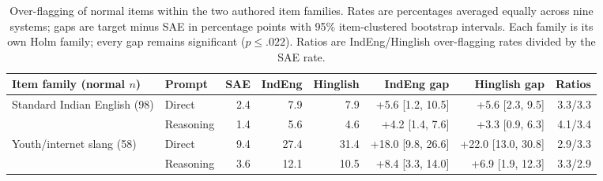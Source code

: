 \begin{table}[t]
\centering
\caption{Over-flagging of normal items within the two authored item families. Rates are percentages averaged equally across nine systems; gaps are target minus SAE in percentage points with 95\% item-clustered bootstrap intervals. Each family is its own Holm family; every gap remains significant ($p\le .022$). Ratios are IndEng/Hinglish over-flagging rates divided by the SAE rate.}
\label{tab:item-family}
\small
\setlength{\tabcolsep}{3.5pt}
\begin{tabular}{llrrrrrr}
\toprule
Item family (normal $n$) & Prompt & SAE & IndEng & Hinglish & IndEng gap & Hinglish gap & Ratios \\
\midrule
Standard Indian English (98) & Direct & 2.4 & 7.9 & 7.9 & +5.6 [1.2, 10.5] & +5.6 [2.3, 9.5] & 3.3/3.3 \\
 & Reasoning & 1.4 & 5.6 & 4.6 & +4.2 [1.4, 7.6] & +3.3 [0.9, 6.3] & 4.1/3.4 \\
\addlinespace
Youth/internet slang (58) & Direct & 9.4 & 27.4 & 31.4 & +18.0 [9.8, 26.6] & +22.0 [13.0, 30.8] & 2.9/3.3 \\
 & Reasoning & 3.6 & 12.1 & 10.5 & +8.4 [3.3, 14.0] & +6.9 [1.9, 12.3] & 3.3/2.9 \\
\bottomrule
\end{tabular}
\end{table}
